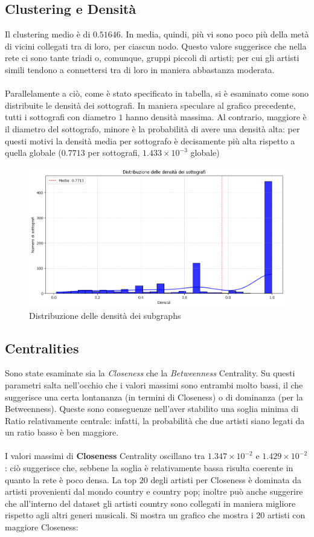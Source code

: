 \documentclass[sigchi]{acmart}
\begin{document}
\subsection{Clustering e Densità}

Il clustering medio è di $0.51646$. In media, quindi, più vi sono poco più della metà di vicini collegati tra di loro, per ciascun nodo. Questo valore suggerisce che nella rete ci sono tante triadi o, comunque, gruppi piccoli di artisti; per cui gli artisti simili tendono a connettersi tra di loro in maniera abbastanza moderata. \\ \\ Parallelamente a ciò, come è stato specificato in tabella, si è esaminato come sono distribuite le densità dei sottografi. In maniera speculare al grafico precedente, tutti i sottografi con diametro $1$ hanno densità massima. Al contrario, maggiore è il diametro del sottografo, minore è la probabilità di avere una densità alta: per questi motivi la densità media per sottografo è decisamente più alta rispetto a quella globale ($0.7713$ per sottografi, $1.433 \times 10^{-3}$ globale)

\begin{figure}[H]
\centering
\includegraphics[width=0.45
\textwidth]{../network_analysis/plots/2_6/densDist.png}
\caption{Distribuzione delle densità dei subgraphs}
\label{fig:densDist}
\end{figure}


\subsection{Centralities}

Sono state esaminate sia la {\itshape Closeness} che la {\itshape Betweenness} Centrality. Su questi parametri salta nell'occhio che i valori massimi sono entrambi molto bassi, il che suggerisce una certa lontananza (in termini di Closeness) o di dominanza (per la Betweenness). Queste sono conseguenze nell'aver stabilito una soglia minima di Ratio relativamente centrale: infatti, la probabilità che due artisti siano legati da un ratio basso è ben maggiore. \\ \\ I valori massimi di {\bfseries Closeness} Centrality oscillano tra $1.347 \times 10^{-2}$ e $1.429 \times 10^{-2}$: ciò suggerisce che, sebbene la soglia è relativamente bassa risulta coerente in quanto la rete è poco densa. La top $20$ degli artisti per Closeness è dominata da artisti provenienti dal mondo country e country pop; inoltre può anche suggerire che all'interno del dataset gli artisti country sono collegati in maniera migliore rispetto agli altri generi musicali. Si mostra un grafico che mostra i $20$ artisti con maggiore Closeness:
\end{document}
